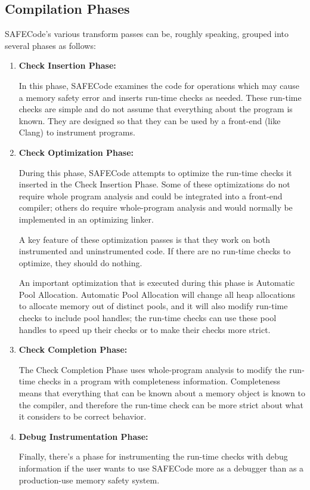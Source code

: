 \subsection{Compilation Phases}
\label{section:struct:phases}

SAFECode's various transform passes can be, roughly speaking, grouped
into several phases as follows:

\begin{enumerate}
\item{\textbf{Check Insertion Phase:}}

In this phase, SAFECode examines the code for operations which may
cause a memory safety error and inserts run-time checks as needed.
These run-time checks are simple and do not assume that everything
about the program is known.  They are designed so that they can be
used by a front-end (like Clang) to instrument programs.

\item{\textbf{Check Optimization Phase:}}

During this phase, SAFECode attempts to optimize the run-time checks
it inserted in the Check Insertion Phase.  Some of these optimizations
do not require whole program analysis and could be integrated into a
front-end compiler; others do require whole-program analysis and would
normally be implemented in an optimizing linker.

A key feature of these optimization passes is that they work on both
instrumented and uninstrumented code.  If there are no run-time checks
to optimize, they should do nothing.

An important optimization that is executed during this phase is
Automatic Pool Allocation.  Automatic Pool Allocation will change all
heap allocations to allocate memory out of distinct pools, and it will
also modify run-time checks to include pool handles; the run-time
checks can use these pool handles to speed up their checks or to make
their checks more strict.

\item{\textbf{Check Completion Phase:}}

The Check Completion Phase uses whole-program analysis to modify the run-time
checks in a program with completeness information.  Completeness means
that everything that can be known about a memory object is known to
the compiler, and therefore the run-time check can be more strict
about what it considers to be correct behavior.

\item{\textbf{Debug Instrumentation Phase:}}

Finally, there's a phase for instrumenting the run-time checks with
debug information if the user wants to use SAFECode more as a debugger
than as a production-use memory safety system.
\end{enumerate}

